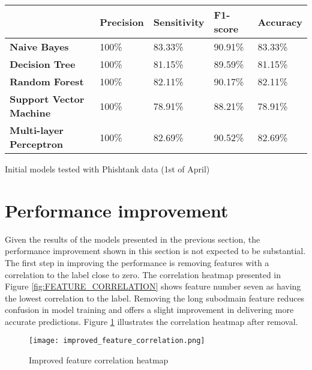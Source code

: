 \begin{singlespace}
	\begin{center}
		\label{tab:FIRST_TRAINED_MODELS}
		\begin{tabular}{ | m{13em} | m{5em} | m{5em} | m{5em} | m{5em} | }
			\hline
			                                & \textbf{Precision} & \textbf{Sensitivity} & \textbf{F1-score} & \textbf{Accuracy} \\
			\hline
			\textbf{Naive Bayes}            & 100\%              & 83.33\%              & 90.91\%           & 83.33\%           \\
			\hline
			\textbf{Decision Tree}          & 100\%              & 81.15\%              & 89.59\%           & 81.15\%           \\
			\hline
			\textbf{Random Forest}          & 100\%              & 82.11\%              & 90.17\%           & 82.11\%           \\
			\hline
			\textbf{Support Vector Machine} & 100\%              & 78.91\%              & 88.21\%           & 78.91\%           \\
			\hline
			\textbf{Multi-layer Perceptron} & 100\%              & 82.69\%              & 90.52\%           & 82.69\%           \\
			\hline
		\end{tabular}
		\captionsetup{type=table}\caption{Initial models tested with Phishtank data (1st of April)}
	\end{center}
\end{singlespace}


\section{Performance improvement}
Given the results of the models presented in the previous section, the performance improvement shown in this section is not expected to be substantial.
The first step in improving the performance is removing features with a correlation to the label close to zero. The correlation heatmap presented in Figure \ref{fig:FEATURE_CORRELATION} shows feature number seven as having the lowest correlation to the label. Removing the long subodmain feature reduces confusion in model training and offers a slight improvement in delivering more accurate predictions. Figure \ref{fig:IMPROVED_FEATURE_CORRELATION} illustrates the correlation heatmap after removal.

\begin{figure}[t]
	\centering
	\texttt{[image: improved\_feature\_correlation.png]}
	\caption{Improved feature correlation heatmap}
	\label{fig:IMPROVED_FEATURE_CORRELATION}
\end{figure}

